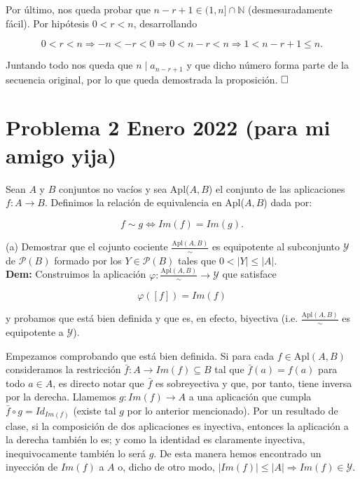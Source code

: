 \documentclass{article}
\begin{document}
Por último, nos queda probar que $n - r + 1 \in (1, n] \cap \mathbb{N}$ (desmesuradamente fácil). Por hipótesis $0 < r < n$, desarrollando

\[0 < r < n \Longrightarrow -n < -r < 0 \Longrightarrow 0 < n - r < n \Longrightarrow 1 < n - r + 1 \leq n.\]

Juntando todo nos queda que $n \mid a_{n - r + 1}$ y que dicho número forma parte de la secuencia original, por lo que queda demostrada la proposición. $\hfill\square$

\newpage

\section{Problema 2 Enero 2022 (para mi amigo yija)}

Sean $A$ y $B$ conjuntos no vacíos y sea Apl($A, B$) el conjunto de las aplicaciones $f : A \longrightarrow B$. Definimos la relación de equivalencia en Apl($A, B$) dada por:

\[f \sim g \Longleftrightarrow Im(f) = Im(g).\]

(a) Demostrar que el cojunto cociente $\frac{\text{Apl}(A, B)}{\sim}$ es equipotente al subconjunto $\mathcal{Y}$ de $\mathcal{P}(B)$ formado por los $Y \in \mathcal{P}(B)$ tales que $0 < |Y| \leq |A|$. \\

\noindent\textbf{Dem:} Construimos la aplicación $\varphi : \frac{\text{Apl}(A, B)}{\sim} \longrightarrow \mathcal{Y}$ que satisface

\[\varphi([f]) = Im(f)\]

y probamos que está bien definida y que es, en efecto, biyectiva (i.e. $\frac{\text{Apl}(A, B)}{\sim}$ es equipotente a $\mathcal{Y}$).

Empezamos comprobando que está bien definida. Si para cada $f \in \text{Apl}(A, B)$ consideramos la restricción $\bar{f} : A \longrightarrow Im(f) \subseteq B$ tal que $\bar{f}(a) = f(a)$ para todo $a \in A$, es directo notar que $\bar{f}$ es sobreyectiva y que, por tanto, tiene inversa por la derecha. Llamemos $g : Im(f) \longrightarrow A$ a una aplicación que cumpla $\bar{f} \circ g = Id_{Im(f)}$ (existe tal $g$ por lo anterior mencionado). Por un resultado de clase, si la composición de dos aplicaciones es inyectiva, entonces la aplicación a la derecha también lo es; y como la identidad es claramente inyectiva, inequivocamente también lo será $g$. De esta manera hemos encontrado un inyección de $Im(f)$ a $A$ o, dicho de otro modo, $|Im(f)| \leq |A| \Longrightarrow Im(f) \in \mathcal{Y}$.
\end{document}

